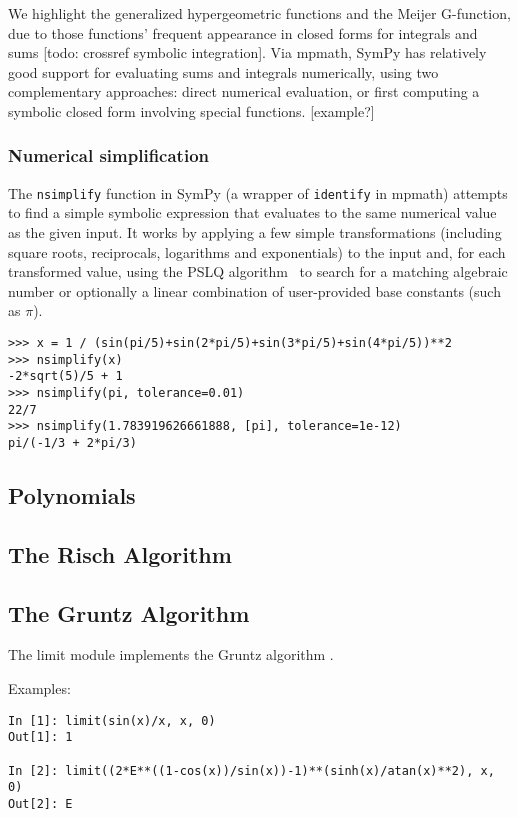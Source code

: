 We highlight the generalized hypergeometric functions and
the Meijer G-function, due to those functions' frequent appearance
in closed forms for integrals and sums [todo: crossref symbolic integration].
Via mpmath, SymPy has relatively good support for evaluating sums and integrals
numerically, using two complementary approaches: direct numerical evaluation,
or first computing a symbolic closed form involving special functions. [example?]

\subsubsection{Numerical simplification}

The \texttt{nsimplify} function in SymPy
(a wrapper of \texttt{identify} in mpmath)
attempts to find a simple symbolic
expression that evaluates to the same numerical value as the given
input.
It works by applying a few simple transformations
(including square roots, reciprocals, logarithms and exponentials) to
the input and, for each transformed value,
using the PSLQ algorithm~\cite{Ferguson1999} to search for
a matching algebraic number or optionally a linear combination
of user-provided base constants (such as $\pi$).

\begin{verbatim}
>>> x = 1 / (sin(pi/5)+sin(2*pi/5)+sin(3*pi/5)+sin(4*pi/5))**2
>>> nsimplify(x)
-2*sqrt(5)/5 + 1
>>> nsimplify(pi, tolerance=0.01)
22/7
>>> nsimplify(1.783919626661888, [pi], tolerance=1e-12)
pi/(-1/3 + 2*pi/3)
\end{verbatim}

\subsection{Polynomials}

\subsection{The Risch Algorithm}

\subsection{The Gruntz Algorithm}

The limit module implements the Gruntz algorithm
\cite{gruntz1996computing}.

Examples:
\begin{verbatim}
In [1]: limit(sin(x)/x, x, 0)
Out[1]: 1

In [2]: limit((2*E**((1-cos(x))/sin(x))-1)**(sinh(x)/atan(x)**2), x, 0)
Out[2]: E
\end{verbatim}

